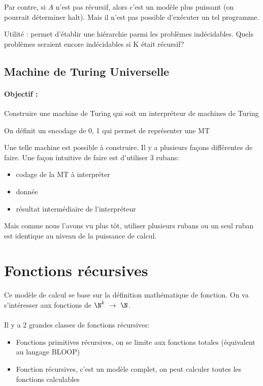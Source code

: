 Par contre, si $A$ n'est pas récursif, alors c'est un modèle plus
puissant (on pourrait déterminer halt). Mais il n’est pas possible d'exécuter un tel programme.

\begin{myrem}
	Utilité : permet d'établir une hiérarchie parmi les problèmes
	indécidables. Quels problèmes seraient encore
	indécidables si K était récursif?
\end{myrem}

\subsection{Machine de Turing Universelle}

\paragraph{Objectif :} Construire une machine de Turing qui soit un
interpréteur de machines de Turing

\begin{myrem}
	On définit un encodage de 0, 1 qui permet de représenter une MT
\end{myrem}

Une telle machine est possible à construire. Il y a plusieurs façons différentes de faire. Une façon intuitive de faire est d'utiliser 3 rubans:
\begin{itemize}
	\item codage de la MT à interpréter
	\item donnée
	\item résultat intermédiaire de l'interpréteur
\end{itemize}
Mais comme nous l'avons vu plus tôt, utiliser plusieurs rubans ou un seul ruban est identique au niveau de la puissance de calcul.

\section{Fonctions récursives}
\label{sub:fonction_r_cursives}
Ce modèle de calcul se base sur la définition mathématique de fonction. On va
s'intéresser aux fonctions de $\N^k \ \rightarrow \ \N$.

\paragraph{} Il y a 2 grandes classes de fonctions récursives:
\begin{itemize}
	\item Fonctions primitives récursives, on se limite aux fonctions totales
		(équivalent au langage BLOOP)
	\item Fonction récursives, c'est un modèle complet, on peut calculer
		toutes les fonctions calculables
\end{itemize}

